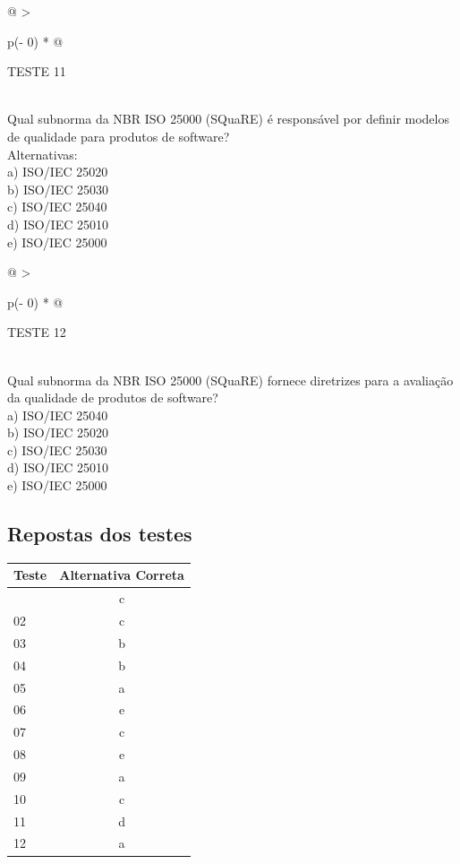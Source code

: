 \documentclass[
]{book}
\begin{document}
\begin{longtable}[]{@{}
  >{\raggedright\arraybackslash}p{(\columnwidth - 0\tabcolsep) * }@{}}
\toprule\noalign{}
\begin{minipage}[b]{\linewidth}\raggedright
TESTE 11
\end{minipage} \\
\midrule\noalign{}
\endhead
\bottomrule\noalign{}
\endlastfoot
Qual subnorma da NBR ISO 25000 (SQuaRE) é responsável por definir modelos de qualidade para produtos de software? \\
Alternativas: \\
a) ISO/IEC 25020 \\
b) ISO/IEC 25030 \\
c) ISO/IEC 25040 \\
d) ISO/IEC 25010 \\
e) ISO/IEC 25000 \\
\end{longtable}

\begin{longtable}[]{@{}
  >{\raggedright\arraybackslash}p{(\columnwidth - 0\tabcolsep) * }@{}}
\toprule\noalign{}
\begin{minipage}[b]{\linewidth}\raggedright
TESTE 12
\end{minipage} \\
\midrule\noalign{}
\endhead
\bottomrule\noalign{}
\endlastfoot
Qual subnorma da NBR ISO 25000 (SQuaRE) fornece diretrizes para a avaliação da qualidade de produtos de software? \\
a) ISO/IEC 25040 \\
b) ISO/IEC 25020 \\
c) ISO/IEC 25030 \\
d) ISO/IEC 25010 \\
e) ISO/IEC 25000 \\
\end{longtable}

\subsection{Repostas dos testes}\label{repostas-dos-testes}

\begin{longtable}[]{@{}lc@{}}
\toprule\noalign{}
Teste & Alternativa Correta \\
\midrule\noalign{}
\endhead
\bottomrule\noalign{}
\endlastfoot
01 & c \\
02 & c \\
03 & b \\
04 & b \\
05 & a \\
06 & e \\
07 & c \\
08 & e \\
09 & a \\
10 & c \\
11 & d \\
12 & a \\
\end{longtable}
\end{document}
